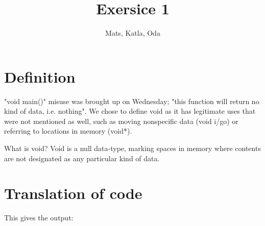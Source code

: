 \documentclass{article}
\title{Exersice 1}
\author{Mats, Katla, Oda}
\begin{document}
\maketitle

\section{Definition}

"void main()" misuse was brought up on Wednesday; "this function will return no kind of data, i.e. nothing". We chose to define void as it has legitimate uses that were not mentioned as well, such as moving nonspecific data (void i/go) or referring to locations in memory (void*).

What is void? Void is a null data-type, marking spaces in memory where contents are not designated as any particular kind of data.

\section{Translation of code}



This gives the output:


\end{document}
